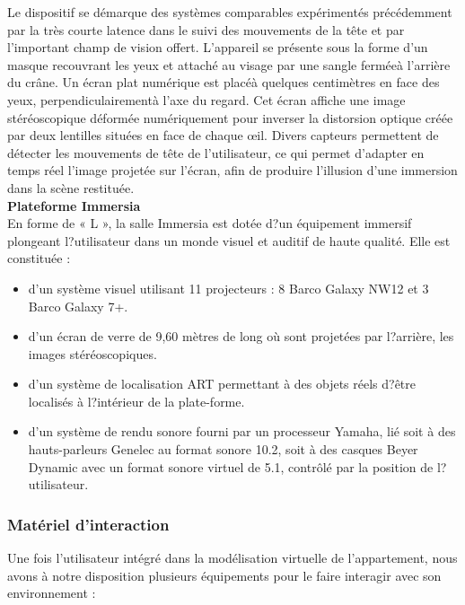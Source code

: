 Le dispositif se d\'emarque des syst\`emes comparables exp\'eriment\'es pr\'ec\'edemment par la tr\`es courte latence dans le suivi des mouvements de la t\^ete et par l'important champ de vision offert. L'appareil se pr\'esente sous la forme d'un masque recouvrant les yeux et attach\'e au visage par une sangle ferm\'ee\`a l'arri\`ere du cr\^ane. Un \'ecran plat num\'erique est plac\'e\`a quelques centim\`etres en face des yeux, perpendiculairement\`a l'axe du regard. Cet \'ecran affiche une image st\'er\'eoscopique d\'eform\'ee num\'eriquement pour inverser la distorsion optique cr\'e\'ee par deux lentilles situ\'ees en face de chaque œil. Divers capteurs permettent de d\'etecter les mouvements de t\^ete de l'utilisateur, ce qui permet d'adapter en temps r\'eel l'image projet\'ee sur l'\'ecran, afin de produire l'illusion d'une immersion dans la sc\`ene restitu\'ee.
\\

\textbf{Plateforme Immersia}
\\

En forme de « L », la salle Immersia est dot\'ee d?un \'equipement immersif plongeant l?utilisateur dans un monde visuel et auditif de haute qualit\'e. 
Elle est constitu\'ee  :
\begin{itemize}
  \item d'un syst\`eme visuel utilisant 11 projecteurs : 8 Barco Galaxy NW12 et 3 Barco Galaxy 7+.
  \item d'un \'ecran de verre de 9,60 m\`etres de long o\`u sont projet\'ees par l?arri\`ere, les images st\'er\'eoscopiques.
  \item d'un syst\`eme de localisation ART permettant \`a des objets r\'eels d?\^etre localis\'es \`a l?int\'erieur de la plate-forme.
  \item d'un syst\`eme de rendu sonore fourni par un processeur Yamaha, li\'e soit \`a des hauts-parleurs Genelec au format sonore 10.2, soit \`a des casques Beyer Dynamic avec un format sonore virtuel de 5.1, contrôl\'e par la position de l?utilisateur.
\end{itemize}

\subsubsection{Mat\'eriel d'interaction}
Une fois l'utilisateur int\'egr\'e dans la mod\'elisation virtuelle de l'appartement, nous avons \`a notre disposition plusieurs \'equipements pour le faire interagir avec son environnement :
\\

